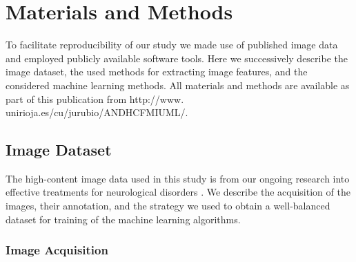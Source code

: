 \section{Materials and Methods}
\label{sec:matmet}

To facilitate reproducibility of our study we made use of published image data and employed publicly available software tools. Here we successively describe the image dataset, the used methods for extracting image features, and the considered machine learning methods. {\color{red}All materials and methods are available as part of this publication from http://www. unirioja.es/cu/jurubio/ANDHCFMIUML/.}

\subsection{Image Dataset}
\label{sec:data}

The high-content image data used in this study is from our ongoing research into effective treatments for neurological disorders \citep{Cuesto-2011, Enriquez-Barreto-2014, Enriquez-Barreto-2016}. We describe the acquisition of the images, their annotation, and the strategy we used to obtain a well-balanced dataset for training of the machine learning algorithms.

\subsubsection{Image Acquisition}
\label{sec:acquisition}

